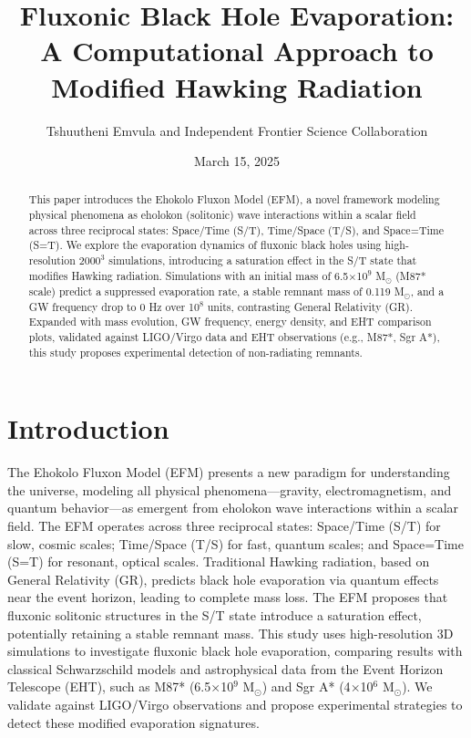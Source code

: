 \documentclass{article}
\title{Fluxonic Black Hole Evaporation: A Computational Approach to Modified Hawking Radiation}
\author{Tshuutheni Emvula and Independent Frontier Science Collaboration}
\date{March 15, 2025}
\begin{document}
\maketitle

\begin{abstract}
This paper introduces the Ehokolo Fluxon Model (EFM), a novel framework modeling physical phenomena as eholokon (solitonic) wave interactions within a scalar field across three reciprocal states: Space/Time (S/T), Time/Space (T/S), and Space=Time (S=T). We explore the evaporation dynamics of fluxonic black holes using high-resolution \(2000^3\) simulations, introducing a saturation effect in the S/T state that modifies Hawking radiation. Simulations with an initial mass of 6.5$\times$10$^9$ M$_\odot$ (M87* scale) predict a suppressed evaporation rate, a stable remnant mass of 0.119 M$_\odot$, and a GW frequency drop to 0 Hz over 10$^8$ units, contrasting General Relativity (GR). Expanded with mass evolution, GW frequency, energy density, and EHT comparison plots, validated against LIGO/Virgo data and EHT observations (e.g., M87*, Sgr A*), this study proposes experimental detection of non-radiating remnants.
\end{abstract}

\section{Introduction}
The Ehokolo Fluxon Model (EFM) presents a new paradigm for understanding the universe, modeling all physical phenomena---gravity, electromagnetism, and quantum behavior---as emergent from eholokon wave interactions within a scalar field. The EFM operates across three reciprocal states: Space/Time (S/T) for slow, cosmic scales; Time/Space (T/S) for fast, quantum scales; and Space=Time (S=T) for resonant, optical scales. Traditional Hawking radiation, based on General Relativity (GR), predicts black hole evaporation via quantum effects near the event horizon, leading to complete mass loss. The EFM proposes that fluxonic solitonic structures in the S/T state introduce a saturation effect, potentially retaining a stable remnant mass. This study uses high-resolution 3D simulations to investigate fluxonic black hole evaporation, comparing results with classical Schwarzschild models and astrophysical data from the Event Horizon Telescope (EHT), such as M87* (6.5$\times$10$^9$ M$_\odot$) and Sgr A* (4$\times$10$^6$ M$_\odot$). We validate against LIGO/Virgo observations and propose experimental strategies to detect these modified evaporation signatures.
\end{document}
